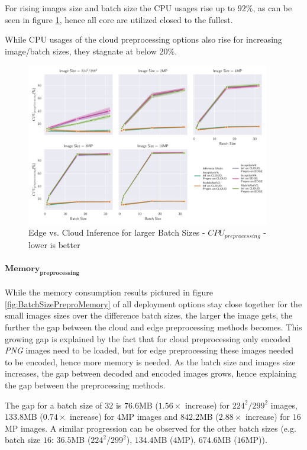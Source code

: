 For rising images size and batch size the CPU usages rise up to $92\%$, as can be seen in figure \ref{fig:BatchSizePreproCPU}, hence all core are utilized closed to the fullest.


While CPU usages of the cloud preprocessing options also rise for increasing image/batch sizes, they stagnate at below $20\%$.
\begin{figure}[!htb]
\centering
\includegraphics[width=0.95\textwidth]{./Bilder/single_plots/batch_size_plots/Effects_of_Batch_size_Preprocessing_CPU_Usage.pdf}
\caption{Edge vs. Cloud Inference for larger Batch Sizes -  $CPU_{preprocessing}$ - lower is better}
\label{fig:BatchSizePreproCPU}
\end{figure}

\paragraph{$\mathbf{Memory_{preprocessing}}$}
While the memory consumption results pictured in figure \ref{fig:BatchSizePreproMemory} of all deployment options stay close together for the small images sizes over the difference batch sizes, the larger the image gets, the further the gap between the cloud and edge preprocessing methods becomes.
This growing gap is explained by the fact that for cloud preprocessing only encoded \emph{PNG} images need to be loaded, but for edge preprocessing these images needed to be encoded, hence more memory is needed.
As the batch size and images size increases, the gap between decoded and encoded images grows, hence explaining the gap between the preprocessing methods.

The gap for a batch size of $32$ is $76.6$MB ($1.56\times$ increase) for $224^2/299^2$ images, $133.8$MB ($0.74\times$ increase) for $4$MP images and $842.2$MB ($2.88\times$ increase) for $16$MP images. 
A similar progression can be observed for the other batch sizes (e.g. batch size $16$: $36.5$MB ($224^2/299^2$), $134.4$MB ($4$MP), $674.6$MB ($16$MP)).

